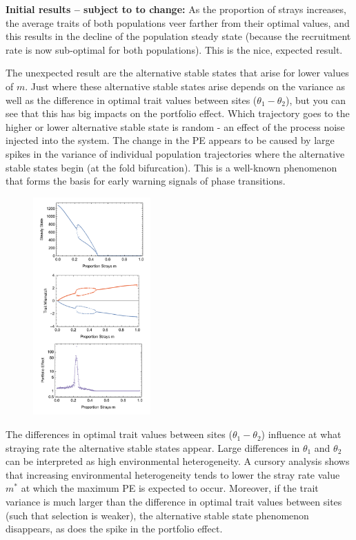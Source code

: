 \documentclass[onecolumn,preprintnumbers,amsmath,amssymb,superscriptaddress]{revtex4}
\begin{document}



{\bf Initial results -- subject to to change:} As the proportion of strays increases, the average traits of both populations veer farther from their optimal values, and this results in the decline of the population steady state (because the recruitment rate is now sub-optimal for both populations). This is the nice, expected result.

The unexpected result are the alternative stable states that arise for lower values of $m$. Just where these alternative stable states arise depends on the variance as well as the difference in optimal trait values between sites ($\theta_1-\theta_2$), but you can see that this has big impacts on the portfolio effect.
Which trajectory goes to the higher or lower alternative stable state is random - an effect of the process noise injected into the system.
The change in the PE appears to be caused by large spikes in the variance of individual population trajectories where the alternative stable states begin (at the fold bifurcation).
This is a well-known phenomenon that forms the basis for early warning signals of phase transitions.

\begin{figure}[h]
\centering
\includegraphics[width=0.4\textwidth]{fig_Density.pdf}
\caption{}
\end{figure}


The differences in optimal trait values between sites ($\theta_1-\theta_2$) influence at what straying rate the alternative stable states appear.
Large differences in $\theta_1$ and $\theta_2$ can be interpreted as high environmental heterogeneity.
A cursory analysis shows that increasing environmental heterogeneity tends to lower the stray rate value $m^*$ at which the maximum PE is expected to occur.
Moreover, if the trait variance is much larger than the difference in optimal trait values between sites (such that selection is weaker), the alternative stable state phenomenon disappears, as does the spike in the portfolio effect.
\end{document}
